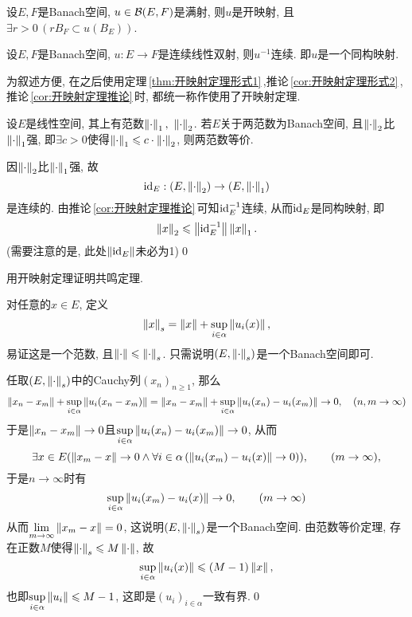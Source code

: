 	\begin{Corollary}[开映射定理]\label{cor:开映射定理形式2}
	设$ E, F $是Banach空间, $ u\in\mathcal{B}(E,F) $是满射, 则$ u $是开映射, 且$ \exists r>0\,(rB_F\subset u(B_E)) $.
	\end{Corollary}
	
	\begin{Corollary}\label{cor:开映射定理推论}
	设$ E, F $是Banach空间, $ u: E\to F $是连续线性双射, 则$ u^{-1} $连续. 即$ u $是一个同构映射.
	\end{Corollary}
	
	为叙述方便, 在之后使用定理\,\ref{thm:开映射定理形式1}\,,推论\,\ref{cor:开映射定理形式2}\,,推论\,\ref{cor:开映射定理推论}\,时, 都统一称作使用了开映射定理.
	
	\begin{Corollary}[范数等价定理]
	设$ E $是线性空间, 其上有范数$ \norm{\cdot}_1,\ \norm{\cdot}_2 $. 若$ E $关于两范数为Banach空间, 且$ \left\| \cdot \right\|_2 $比$ \left\| \cdot \right\|_1 $强, 即$ \exists c>0 $使得$ \left\| \cdot \right\|_1\leqslant c\cdot\left\| \cdot \right\|_2 $, 则两范数等价.
	\end{Corollary}
	\begin{Proof}
	因$ \left\| \cdot \right\|_2 $比$ \left\| \cdot \right\|_1 $强, 故
	\[
	\mathrm{id}_E : (E,\left\| \cdot \right\|_2)\to(E,\left\| \cdot \right\|_1)
	\]
	是连续的. 由推论\,\ref{cor:开映射定理推论}\,可知$ \mathrm{id}_E^{-1} $连续, 从而$ \mathrm{id}_E $是同构映射, 即
	\[
	\left\| x \right\|_2\leqslant\left\| \mathrm{id}_E^{-1} \right\|\left\| x \right\|_1.
	\]
	(需要注意的是, 此处$ \left\| \mathrm{id}_E \right\| $未必为1)\qed
	\end{Proof}
	
	\begin{Example}
	用开映射定理证明共鸣定理.
	\end{Example}
	\begin{Proof}
	对任意的$ x\in E $, 定义
	\[
	\left\| x \right\|_s=\left\| x \right\|+\sup_{i\in\alpha}\left\| u_i(x) \right\|,
	\]
	易证这是一个范数, 且$ \left\| \cdot \right\|\leqslant\left\| \cdot \right\|_s $. 只需说明$ (E,\left\| \cdot \right\|_s) $是一个Banach空间即可.
	
	任取$ (E,\left\| \cdot \right\|_s) $中的Cauchy列$ (x_n)_{n\geqslant 1} $, 那么
	\[
	\left\| x_n-x_m \right\|+\sup_{i\in\alpha}\left\| u_i(x_n-x_m) \right\|=\left\| x_n-x_m \right\|+\sup_{i\in\alpha}\left\| u_i(x_n)-u_i(x_m) \right\|\to 0,\quad (n,m\to\infty)
	\]
	于是$ \left\| x_n-x_m \right\|\to 0 $且$ \sup\limits_{i\in\alpha}\left\| u_i(x_n)-u_i(x_m) \right\|\to 0 $, 从而
	\[
	\exists x\in E(\left\| x_m-x \right\|\to 0\land\forall i\in\alpha\,(\left\| u_i(x_m)-u_i(x) \right\|\to 0)),\qquad (m\to\infty),
	\]
	于是$ n\to \infty $时有
	\[
	\sup_{i\in\alpha}\left\| u_i(x_m)-u_i(x) \right\|\to 0,\qquad (m\to\infty)
	\]
	从而$ \lim\limits_{m\to\infty}\left\| x_m-x \right\|=0 $, 这说明$ (E,\left\| \cdot \right\|_s) $是一个Banach空间. 由范数等价定理, 存在正数$ M $使得$ \left\| \cdot \right\|_s\leqslant M\left\| \cdot \right\| $, 故
	\[
	\sup_{i\in\alpha}\left\| u_i(x) \right\|\leqslant (M-1)\left\| x \right\|,
	\]
	也即$ \sup\limits_{i\in\alpha}\left\| u_i \right\|\leqslant M-1 $, 这即是$ (u_i)_{i\in\alpha} $一致有界.\qed
	\end{Proof}
	
